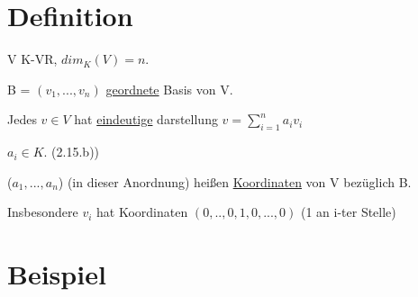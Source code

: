 \documentclass[a4paper, openany]{book}
\begin{document}
    \section{Definition}

    V K-VR, $dim_K(V) = n$.

    B = $(v_1, ..., v_n)$ \underline{geordnete} Basis von V.

    \par \medskip

    Jedes $v \in V$ hat \underline{eindeutige} darstellung $v = \sum_{i=1}^{n} a_iv_i$

    $a_i \in K$. (2.15.b))

    ($a_1, ..., a_n$) (in dieser Anordnung) heißen \underline{Koordinaten} von V bezüglich B.

    \par \medskip

    Insbesondere $v_i$ hat Koordinaten $(0,..,0,1,0,...,0)$ (1 an i-ter Stelle)

    \section{Beispiel}
\end{document}
